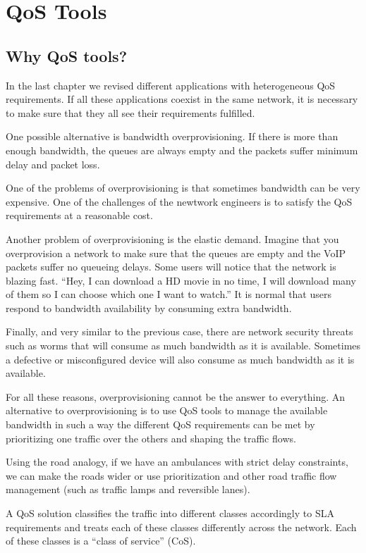 \chapter{QoS Tools}
\section{Why QoS tools?}
In the last chapter we revised different applications with heterogeneous QoS requirements.
If all these applications coexist in the same network, it is necessary to make sure that they all see their requirements fulfilled.

One possible alternative is bandwidth overprovisioning.
If there is more than enough bandwidth, the queues are always empty and the packets suffer minimum delay and packet loss.

One of the problems of overprovisioning is that sometimes bandwidth can be very expensive.
One of the challenges of the newtwork engineers is to satisfy the QoS requirements at a reasonable cost.

Another problem of overprovisioning is the elastic demand.
Imagine that you overprovision a network to make sure that the queues are empty and the VoIP packets suffer no queueing delays.
Some users will notice that the network is blazing fast.
``Hey, I can download a HD movie in no time, I will download many of them so I can choose which one I want to watch.''
It is normal that users respond to bandwidth availability by consuming extra bandwidth.

Finally, and very similar to the previous case, there are network security threats such as worms that will consume as much bandwidth as it is available.
Sometimes a defective or misconfigured device will also consume as much bandwidth as it is available.

For all these reasons, overprovisioning cannot be the answer to everything.
An alternative to overprovisioning is to use QoS tools to manage the available bandwidth in such a way the different QoS requirements can be met by prioritizing one traffic over the others and shaping the traffic flows.

Using the road analogy, if we have an ambulances with strict delay constraints, we can make the roads wider or use prioritization and other road traffic flow management (such as traffic lamps and reversible lanes).

A QoS solution classifies the traffic into different classes accordingly to SLA requirements and treats each of these classes differently across the network.
Each of these classes is a ``class of service'' (CoS).


